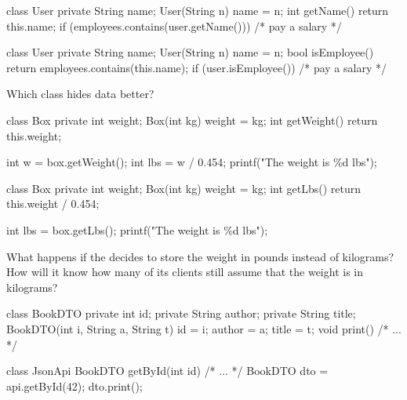 \documentclass{article}
\begin{document}
\begin{pptWide}{2}
{\small\begin{ffcode}
class User {
  private String name;
  User(String n) { name = n; }
  int getName() {
    return this.name;
  }
}
if (employees.contains(user.getName())) {
  /* pay a salary */
}
\end{ffcode}
}
\par\columnbreak\par
{\small\begin{ffcode}
class User {
  private String name;
  User(String n) { name = n; }
  bool isEmployee() {
    return employees.contains(this.name);
  }
}
if (user.isEmployee()) {
  /* pay a salary */
}
\end{ffcode}
}
\end{pptWide}
\par
Which class hides data better?
\plush{}

\begin{pptWide}{2}
{\small\begin{ffcode}
class Box {
  private int weight;
  Box(int kg) { weight = kg; }
  int getWeight() {
    return this.weight;
  }
}

int w = box.getWeight();
int lbs = w / 0.454;
printf("The weight is \%d lbs\n");
\end{ffcode}
}
\par\columnbreak\par
{\small\begin{ffcode}
class Box {
  private int weight;
  Box(int kg) { weight = kg; }
  int getLbs() {
    return this.weight / 0.454;
  }
}

int lbs = box.getLbs();
printf("The weight is \%d lbs\n");
\end{ffcode}
}
\end{pptWide}
\par
What happens if the  decides to store the weight in pounds instead of kilograms? How will it know how many of its clients still assume that the weight is in kilograms?
\plush{}


\begin{pptWide}{2}
{\small\begin{ffcode}
class BookDTO {
  private int id;
  private String author;
  private String title;
  BookDTO(int i, String a, String t)
    { id = i; author = a; title = t; }
  void print() { /* ... */ }
}
\end{ffcode}
}
\par\columnbreak\par
{\small\begin{ffcode}
class JsonApi {
  BookDTO getById(int id) { /* ... */ }
}
BookDTO dto = api.getById(42);
dto.print();
\end{ffcode}
}
\end{pptWide}
\par
\plush{}
\end{document}
